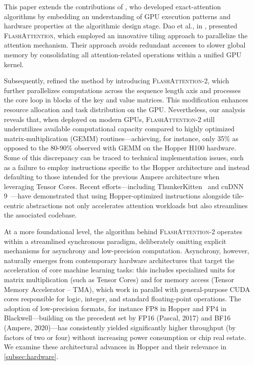 This paper extends the contributions of \citet{dao2022flashattention}, who developed exact-attention algorithms by embedding an understanding of GPU execution patterns and hardware properties at the algorithmic design stage. Dao et al., in \citep{dao2022flashattention}, presented \textsc{FlashAttention}, which employed an innovative tiling approach to parallelize the attention mechanism. Their approach avoids redundant accesses to slower global memory by consolidating all attention-related operations within a unified GPU kernel.

Subsequently, \citet{dao2023flashattention2} refined the method by introducing \textsc{FlashAttention-2}, which further parallelizes computations across the sequence length axis and processes the core loop in blocks of the key and value matrices. This modification enhances resource allocation and task distribution on the GPU. Nevertheless, our analysis reveals that, when deployed on modern GPUs, \textsc{FlashAttention-2} still underutilizes available computational capacity compared to highly optimized matrix-multiplication (GEMM) routines—achieving, for instance, only 35\% as opposed to the 80-90\% observed with GEMM on the Hopper H100 hardware. Some of this discrepancy can be traced to technical implementation issues, such as a failure to employ instructions specific to the Hopper architecture and instead defaulting to those intended for the previous Ampere architecture when leveraging Tensor Cores. Recent efforts—including ThunkerKitten~\citep{spector2024thunder} and cuDNN 9~\citep{cudnn9}—have demonstrated that using Hopper-optimized instructions alongside tile-centric abstractions not only accelerates attention workloads but also streamlines the associated codebase.

At a more foundational level, the algorithm behind \textsc{FlashAttention-2} operates within a streamlined synchronous paradigm, deliberately omitting explicit mechanisms for asynchrony and low-precision computation. Asynchrony, however, naturally emerges from contemporary hardware architectures that target the acceleration of core machine learning tasks: this includes specialized units for matrix multiplication (such as Tensor Cores) and for memory access (Tensor Memory Accelerator -- TMA), which work in parallel with general-purpose CUDA cores responsible for logic, integer, and standard floating-point operations. The adoption of low-precision formats, for instance FP8 in Hopper and FP4 in Blackwell—building on the precedent set by FP16 (Pascal, 2017) and BF16 (Ampere, 2020)—has consistently yielded significantly higher throughput (by factors of two or four) without increasing power consumption or chip real estate. We examine these architectural advances in Hopper and their relevance in \cref{subsec:hardware}.

